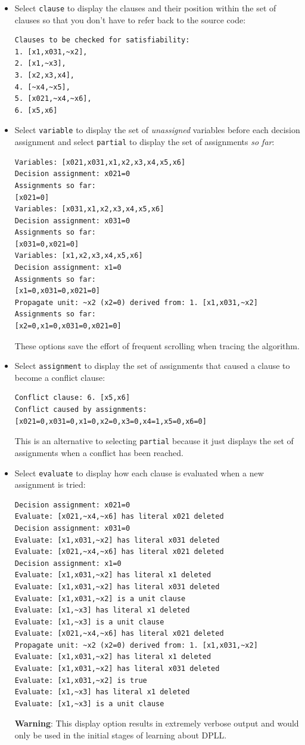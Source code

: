 \documentclass[11pt]{report}
\newcommand*{\p}[1]{\textup{\texttt{#1}}}
\begin{document}
\begin{itemize}

\item Select \p{clause} to display the clauses and their position within
the set of clauses so that you don't have to refer back to the source
code:

\begin{verbatim}
Clauses to be checked for satisfiability:
1. [x1,x031,~x2],
2. [x1,~x3],
3. [x2,x3,x4],
4. [~x4,~x5],
5. [x021,~x4,~x6],
6. [x5,x6]
\end{verbatim}

\item Select \p{variable} to display the set of \emph{unassigned}
variables before each decision assignment and select \p{partial} to
display the set of assignments \emph{so far}:

\begin{verbatim}
Variables: [x021,x031,x1,x2,x3,x4,x5,x6]
Decision assignment: x021=0
Assignments so far:
[x021=0]
Variables: [x031,x1,x2,x3,x4,x5,x6]
Decision assignment: x031=0
Assignments so far:
[x031=0,x021=0]
Variables: [x1,x2,x3,x4,x5,x6]
Decision assignment: x1=0
Assignments so far:
[x1=0,x031=0,x021=0]
Propagate unit: ~x2 (x2=0) derived from: 1. [x1,x031,~x2]
Assignments so far:
[x2=0,x1=0,x031=0,x021=0]
\end{verbatim}

These options save the effort of frequent scrolling when tracing the
algorithm.

\item Select \p{assignment} to display the set of assignments that caused a
clause to become a conflict clause:
\begin{verbatim}
Conflict clause: 6. [x5,x6]
Conflict caused by assignments:
[x021=0,x031=0,x1=0,x2=0,x3=0,x4=1,x5=0,x6=0]
\end{verbatim}
This is an alternative to selecting \p{partial} because it just displays
the set of assignments when a conflict has been reached.

\item Select \p{evaluate} to display how each clause is evaluated when a
new assignment is tried:

\begin{verbatim}
Decision assignment: x021=0
Evaluate: [x021,~x4,~x6] has literal x021 deleted
Decision assignment: x031=0
Evaluate: [x1,x031,~x2] has literal x031 deleted
Evaluate: [x021,~x4,~x6] has literal x021 deleted
Decision assignment: x1=0
Evaluate: [x1,x031,~x2] has literal x1 deleted
Evaluate: [x1,x031,~x2] has literal x031 deleted
Evaluate: [x1,x031,~x2] is a unit clause
Evaluate: [x1,~x3] has literal x1 deleted
Evaluate: [x1,~x3] is a unit clause
Evaluate: [x021,~x4,~x6] has literal x021 deleted
Propagate unit: ~x2 (x2=0) derived from: 1. [x1,x031,~x2]
Evaluate: [x1,x031,~x2] has literal x1 deleted
Evaluate: [x1,x031,~x2] has literal x031 deleted
Evaluate: [x1,x031,~x2] is true
Evaluate: [x1,~x3] has literal x1 deleted
Evaluate: [x1,~x3] is a unit clause
\end{verbatim}
\textbf{Warning}: This display option results in extremely verbose output
and would only be used in the initial stages of learning about DPLL.


\end{itemize}
\end{document}
